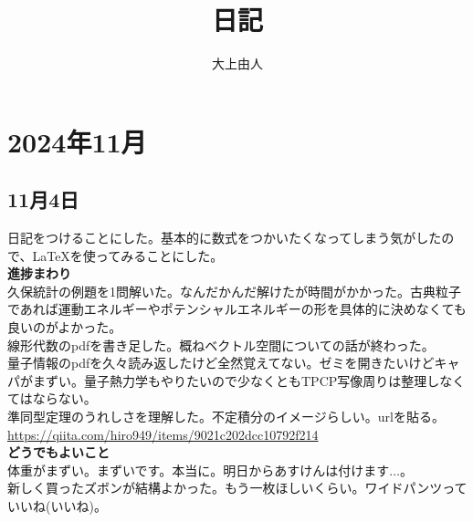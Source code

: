\documentclass[a4paper,11pt]{jsarticle}
\numberwithin{equation}{section}
\begin{document}
\title{日記}
\author{大上由人}
\maketitle

\section*{2024年11月}
\subsection*{11月4日}
日記をつけることにした。基本的に数式をつかいたくなってしまう気がしたので、\LaTeX を使ってみることにした。\\
\textbf{進捗まわり} \\
久保統計の例題を1問解いた。なんだかんだ解けたが時間がかかった。古典粒子であれば運動エネルギーやポテンシャルエネルギーの形を具体的に決めなくても良いのがよかった。\\
線形代数のpdfを書き足した。概ねベクトル空間についての話が終わった。\\
量子情報のpdfを久々読み返したけど全然覚えてない。ゼミを開きたいけどキャパがまずい。量子熱力学もやりたいので少なくともTPCP写像周りは整理しなくてはならない。\\
準同型定理のうれしさを理解した。不定積分のイメージらしい。urlを貼る。\url{https://qiita.com/hiro949/items/9021c202dcc10792f214}\\
\textbf{どうでもよいこと} \\
体重がまずい。まずいです。本当に。明日からあすけんは付けます$\dots$。\\
新しく買ったズボンが結構よかった。もう一枚ほしいくらい。ワイドパンツっていいね(いいね)。\\
\end{document}
